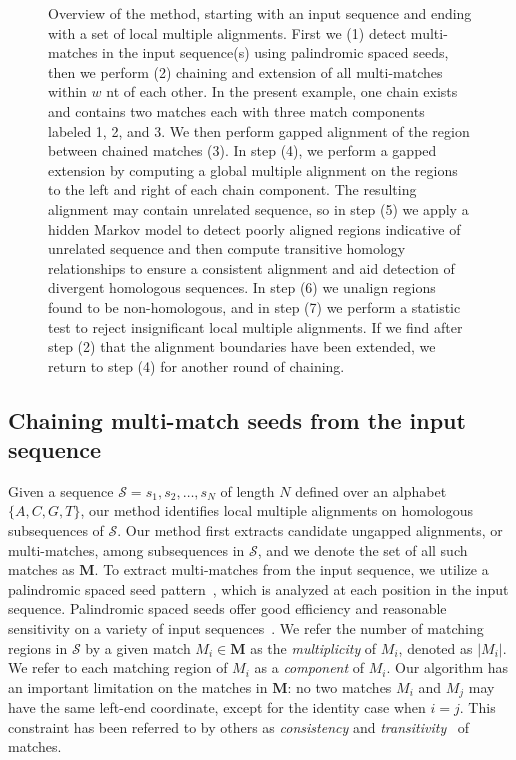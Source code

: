 \documentclass[10pt,journal,letterpaper,compsoc,peerreview]{IEEEtran}
\begin{document}
\begin{figure}[t!]
\begin{center}
\end{center}
\caption[Overview of our method for local multiple alignment]%
{\scriptsize Overview of the method, starting with an input sequence and ending
with a set of local multiple alignments. First we (1) detect
multi-matches in the input sequence(s) using palindromic spaced seeds,
then we perform (2) chaining and extension of all multi-matches within
$w$ nt of each other.  In the present example, one chain exists and
contains two matches each with three match components labeled 1, 2,
and 3.  We then perform gapped alignment of the region between chained
matches (3).  In step (4), we perform a gapped extension by computing
a global multiple alignment on the regions to the left and right of
each chain component.  The resulting alignment may contain unrelated
sequence, so in step (5) we apply a hidden Markov model to detect
poorly aligned regions indicative of unrelated sequence and then
compute transitive homology relationships to ensure a consistent
alignment and aid detection of divergent homologous sequences.
In step (6) we unalign regions found to be non-homologous, and
in step (7) we perform a statistic test to reject insignificant
local multiple alignments. If we find after step (2) that the alignment boundaries have been
extended, we return to step (4) for another round of chaining.}
\label{fig-main}
\end{figure}

\subsection{Chaining multi-match seeds from the input sequence}
Given a sequence $\mathcal{S}=s_1, s_2,\dots, s_N$ of length $N$
defined over an alphabet $\{A,C,G,T\}$, our method identifies
local multiple alignments on homologous subsequences of
$\mathcal{S}$. Our method first extracts candidate ungapped
alignments, or multi-matches, among subsequences in $\mathcal{S}$,
and we denote the set of all such matches as $\mathbf{M}$. To extract multi-matches from the input
sequence, we utilize a palindromic spaced seed pattern~\cite{ref-zhang}, which is
analyzed at each position in the input sequence.
Palindromic spaced seeds offer good efficiency and
reasonable sensitivity on a variety of input
sequences~\cite{ref-procrast}.  We refer the number of matching regions
in $\mathcal{S}$ by a given match $M_i \in \mathbf{M}$ as the
\textit{multiplicity} of $M_i$, denoted as $|M_i|$. We refer to each
matching region of $M_i$ as a \textit{component} of $M_i$. Our
algorithm has an important limitation on the matches in $\mathbf{M}$:
no two matches $M_i$ and $M_j$ may have the same left-end coordinate,
except for the identity case when $i=j$.  This constraint has been
referred to by others as \textit{consistency} and
\textit{transitivity}~\cite{ref-transitivity} of matches.
\end{document}
